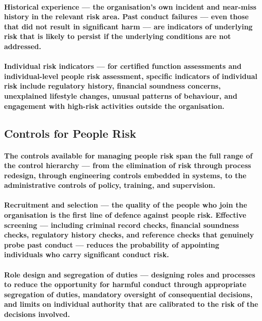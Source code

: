 \paragraph{\textbf{Historical experience} — the organisation's own incident and near-miss history in the relevant risk area. Past conduct failures — even those that did not result in significant harm — are indicators of underlying risk that is likely to persist if the underlying conditions are not addressed.}
\paragraph{\textbf{Individual risk indicators} — for certified function assessments and individual-level people risk assessment, specific indicators of individual risk include regulatory history, financial soundness concerns, unexplained lifestyle changes, unusual patterns of behaviour, and engagement with high-risk activities outside the organisation.}

\subsection{Controls for People Risk}
\paragraph{The controls available for managing people risk span the full range of the control hierarchy — from the elimination of risk through process redesign, through engineering controls embedded in systems, to the administrative controls of policy, training, and supervision.}
\paragraph{\textbf{Recruitment and selection} — the quality of the people who join the organisation is the first line of defence against people risk. Effective screening — including criminal record checks, financial soundness checks, regulatory history checks, and reference checks that genuinely probe past conduct — reduces the probability of appointing individuals who carry significant conduct risk.}
\paragraph{\textbf{Role design and segregation of duties} — designing roles and processes to reduce the opportunity for harmful conduct through appropriate segregation of duties, mandatory oversight of consequential decisions, and limits on individual authority that are calibrated to the risk of the decisions involved.}
